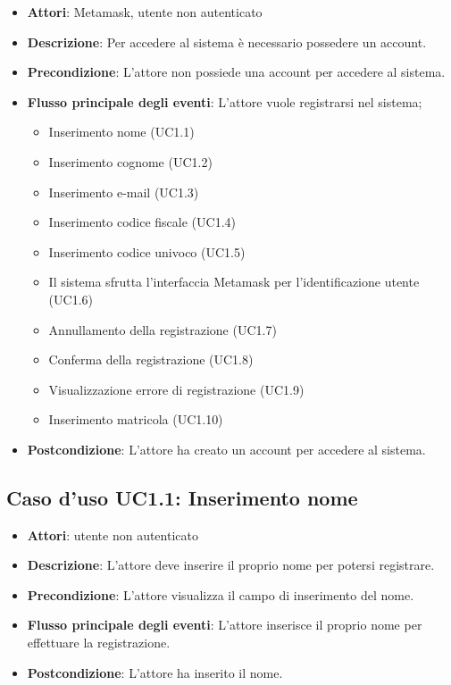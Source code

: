 \begin{itemize}
\item \textbf{Attori}: Metamask, utente non autenticato
\item \textbf{Descrizione}: Per accedere al sistema è necessario possedere un account.
\item \textbf{Precondizione}: L'attore non possiede una account per accedere al sistema.
\item \textbf{Flusso principale degli eventi}: L'attore vuole registrarsi nel sistema;
\begin{itemize}
\item Inserimento nome (UC1.1)
\item Inserimento cognome (UC1.2)
\item Inserimento e-mail (UC1.3)
\item Inserimento codice fiscale (UC1.4)
\item Inserimento codice univoco (UC1.5)
\item Il sistema sfrutta l'interfaccia Metamask per l'identificazione utente (UC1.6)
\item Annullamento della registrazione (UC1.7)
\item Conferma della registrazione (UC1.8)
\item Visualizzazione errore di registrazione (UC1.9)
\item Inserimento matricola (UC1.10)
\end{itemize}
\item \textbf{Postcondizione}: L'attore ha creato un account per accedere al sistema.
\end{itemize}
\subsection{Caso d'uso \texorpdfstring{UC1.1}{UC1.1}: Inserimento nome}
\begin{itemize}
\item \textbf{Attori}: utente non autenticato
\item \textbf{Descrizione}: L'attore deve inserire il proprio nome per potersi registrare.
\item \textbf{Precondizione}: L'attore visualizza il campo di inserimento del nome.
\item \textbf{Flusso principale degli eventi}: L'attore inserisce il proprio nome per effettuare la registrazione.
\item \textbf{Postcondizione}: L'attore ha inserito il nome.
\end{itemize}
